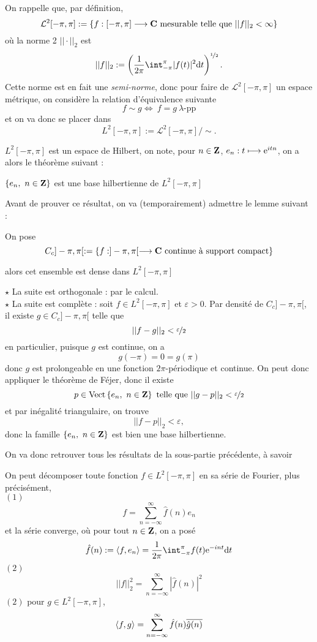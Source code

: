 \documentclass[a4paper,11pt, twoside]{article}
\begin{document}

On rappelle que, par définition, 
$$\mathcal L^2[-\pi,\pi]:=\left\{f:[-\pi,\pi]\longrightarrow\mathbf C\text{ mesurable telle que }||f||_2<\infty\right\}$$
où la norme 2 $||\cdot||_2$ est 
$$||f||_2:=\left(\frac{1}{2\pi}\int_{-\pi}^{\pi}|f(t)|^2\dt\right)^{\nicefrac12}.$$
Cette norme est en fait une \emph{semi-norme}, donc pour faire de $\mathcal L^2[-\pi,\pi]$ un espace métrique, on considère la relation d'équivalence suivante 
$$f\sim g\Leftrightarrow\ f=g\ \lambda\text{-pp}$$
et on va donc se placer dans 
$$L^2[-\pi,\pi]:=\mathcal L^2[-\pi,\pi]/\sim.$$


$L^2[-\pi,\pi]$ est un espace de Hilbert, on note, pour $n\in\mathbf Z$, $e_n:t\longmapsto\mathrm{e}^{itn}$, on a alors le théorème suivant :


\begin{Th}
  $\left\{e_n,\ n\in\mathbf Z\right\}$ est une base hilbertienne de $L^2[-\pi,\pi]$
\end{Th}

Avant de prouver ce résultat, on va (temporairement) admettre le lemme suivant : 


\begin{lemme}
  On pose 
  $$C_c]-\pi,\pi[:=\left\{f:]-\pi,\pi[\longrightarrow\mathbf C\text{ continue à support compact}\right\}$$

  alors cet ensemble est dense dans $L^2[-\pi,\pi]$
\end{lemme}



\begin{Proof}
  $\star$ La suite est orthogonale : par le calcul.\\

  $\star$ La suite est complète : soit $f\in L^2[-\pi,\pi]$ et $\varepsilon>0$. Par densité de $C_c]-\pi,\pi[$, il existe $g\in C_c]-\pi,\pi[$ telle que 
  $$||f-g||_2<\displaystyle\nicefrac{\varepsilon}{2}$$
  en particulier, puisque $g$ est continue, on a 
  $$g(-\pi)=0=g(\pi)$$
  donc $g$ est prolongeable en une fonction $2\pi$-périodique et continue. On peut donc appliquer le théorème de Féjer, donc il existe 
  $$p\in\mathrm{Vect}\left\{e_n,\ n\in\mathbf Z\right\}\text{ telle que }||g-p||_2<\displaystyle\nicefrac{\varepsilon}{2}$$
  et par inégalité triangulaire, on trouve 
  $$||f-p||_2<\varepsilon,$$
  donc la famille $\left\{e_n,\ n\in\mathbf Z\right\}$ est bien une base hilbertienne.
\end{Proof}


On va donc retrouver tous les résultats de la sous-partie précédente, à savoir 


\begin{Th}
  On peut décomposer toute fonction $f\in L^2[-\pi,\pi]$ en sa série de Fourier, plus précisément,\\

  $(\mathit 1)$ 
  $$f=\sum_{n=-\infty}^{\infty}\hat f(n)e_n$$
  et la série converge, où pour tout $n\in\mathbf Z$, on a posé 
  $$\hat f(n):=\ps{f,e_n}=\frac{1}{2\pi}\int_{-\pi}^{\pi}f(t)\ex{-int}\dt$$
  $(\mathit 2)$  
  $$||f||_2^2=\sum_{n=-\infty}^{\infty}|\hat f(n)|^2$$
  $(\mathit 2)$ pour $g\in L^2[-\pi,\pi]$,
  $$\left\langle f,g \right\rangle=\sum_{n=-\infty}^{\infty}\hat f(n)\overline{\hat g(n)}$$
\end{Th}
\end{document}
